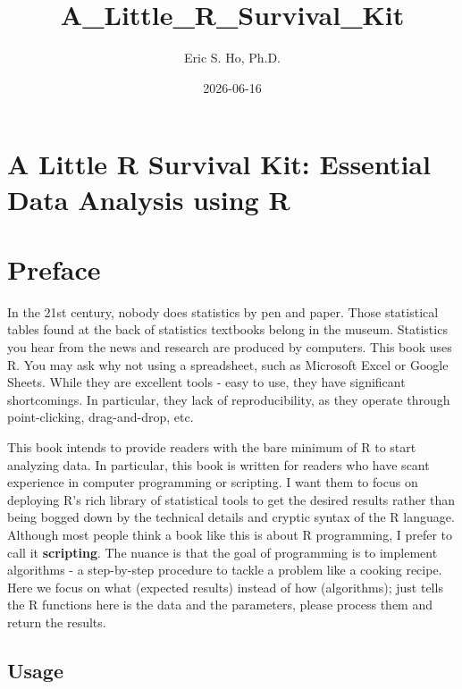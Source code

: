 \documentclass[
  letterpaper,
]{book}
\title{A\_Little\_R\_Survival\_Kit}
\author{Eric S. Ho, Ph.D.}
\date{2026-06-16}
\renewcommand*\contentsname{Table of contents}
\newcommand\contentsname{Table of contents}
\begin{document}
\frontmatter
\maketitle

\renewcommand*\contentsname{Table of contents}
{
\setcounter{tocdepth}{2}
\tableofcontents
}

\mainmatter
{}

\chapter{A Little R Survival Kit: Essential Data Analysis using
R}\label{a-little-r-survival-kit-essential-data-analysis-using-r}


\chapter*{Preface}\label{preface}


In the 21st century, nobody does statistics by pen and paper. Those
statistical tables found at the back of statistics textbooks belong in
the museum. Statistics you hear from the news and research are produced
by computers. This book uses R. You may ask why not using a spreadsheet,
such as Microsoft Excel or Google Sheets. While they are excellent tools
- easy to use, they have significant shortcomings. In particular, they
lack of reproducibility, as they operate through point-clicking,
drag-and-drop, etc.

This book intends to provide readers with the bare minimum of R to start
analyzing data. In particular, this book is written for readers who have
scant experience in computer programming or scripting. I want them to
focus on deploying R's rich library of statistical tools to get the
desired results rather than being bogged down by the technical details
and cryptic syntax of the R language. Although most people think a book
like this is about R programming, I prefer to call it
\textbf{scripting}. The nuance is that the goal of programming is to
implement algorithms - a step-by-step procedure to tackle a problem like
a cooking recipe. Here we focus on what (expected results) instead of
how (algorithms); just tells the R functions here is the data and the
parameters, please process them and return the results.

\section*{Usage}\label{usage}
\end{document}
